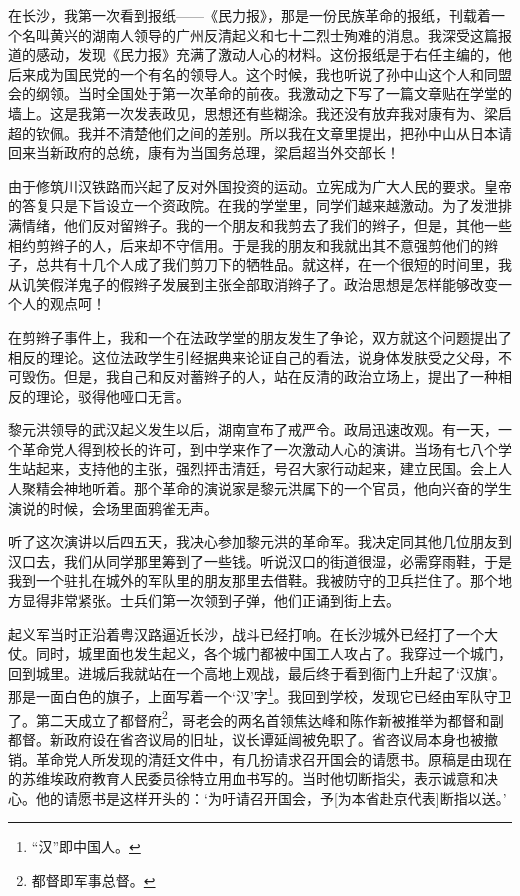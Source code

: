 \documentclass[10pt]{book}
\begin{document}
在长沙，我第一次看到报纸——《民力报》，那是一份民族革命的报纸，刊载着一个名叫黄兴的湖南人领导的广州反清起义和七十二烈士殉难的消息。我深受这篇报道的感动，发现《民力报》充满了激动人心的材料。这份报纸是于右任主编的，他后来成为国民党的一个有名的领导人。这个时候，我也听说了孙中山这个人和同盟会的纲领。当时全国处于第一次革命的前夜。我激动之下写了一篇文章贴在学堂的墙上。这是我第一次发表政见，思想还有些糊涂。我还没有放弃我对康有为、梁启超的钦佩。我并不清楚他们之间的差别。所以我在文章里提出，把孙中山从日本请回来当新政府的总统，康有为当国务总理，梁启超当外交部长！

由于修筑川汉铁路而兴起了反对外国投资的运动。立宪成为广大人民的要求。皇帝的答复只是下旨设立一个资政院。在我的学堂里，同学们越来越激动。为了发泄排满情绪，他们反对留辫子。我的一个朋友和我剪去了我们的辫子，但是，其他一些相约剪辫子的人，后来却不守信用。于是我的朋友和我就出其不意强剪他们的辫子，总共有十几个人成了我们剪刀下的牺牲品。就这样，在一个很短的时间里，我从讥笑假洋鬼子的假辫子发展到主张全部取消辫子了。政治思想是怎样能够改变一个人的观点呵！

在剪辫子事件上，我和一个在法政学堂的朋友发生了争论，双方就这个问题提出了相反的理论。这位法政学生引经据典来论证自己的看法，说身体发肤受之父母，不可毁伤。但是，我自己和反对蓄辫子的人，站在反清的政治立场上，提出了一种相反的理论，驳得他哑口无言。

黎元洪领导的武汉起义发生以后，湖南宣布了戒严令。政局迅速改观。有一天，一个革命党人得到校长的许可，到中学来作了一次激动人心的演讲。当场有七八个学生站起来，支持他的主张，强烈抨击清廷，号召大家行动起来，建立民国。会上人人聚精会神地听着。那个革命的演说家是黎元洪属下的一个官员，他向兴奋的学生演说的时候，会场里面鸦雀无声。

听了这次演讲以后四五天，我决心参加黎元洪的革命军。我决定同其他几位朋友到汉口去，我们从同学那里筹到了一些钱。听说汉口的街道很湿，必需穿雨鞋，于是我到一个驻扎在城外的军队里的朋友那里去借鞋。我被防守的卫兵拦住了。那个地方显得非常紧张。士兵们第一次领到子弹，他们正诵到街上去。

起义军当时正沿着粤汉路逼近长沙，战斗已经打响。在长沙城外已经打了一个大仗。同时，城里面也发生起义，各个城门都被中国工人攻占了。我穿过一个城门，回到城里。进城后我就站在一个高地上观战，最后终于看到衙门上升起了‘汉旗’。那是一面白色的旗子，上面写着一个‘汉’字\footnote{“汉”即中国人。}。我回到学校，发现它已经由军队守卫了。第二天成立了都督府\footnote{都督即军事总督。}，哥老会的两名首领焦达峰和陈作新被推举为都督和副都督。新政府设在省咨议局的旧址，议长谭延闿被免职了。省咨议局本身也被撤销。革命党人所发现的清廷文件中，有几扮请求召开国会的请愿书。原稿是由现在的苏维埃政府教育人民委员徐特立用血书写的。当时他切断指尖，表示诚意和决心。他的请愿书是这样开头的：‘为吁请召开国会，予[为本省赴京代表]断指以送。’
\end{document}
